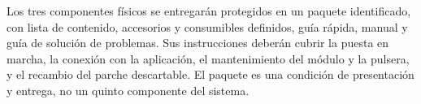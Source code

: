 Los tres componentes físicos se entregarán protegidos en un paquete identificado, con lista de contenido, accesorios y consumibles definidos, guía rápida, manual y guía de solución de problemas. Sus instrucciones deberán cubrir la puesta en marcha, la conexión con la aplicación, el mantenimiento del módulo y la pulsera, y el recambio del parche descartable. El paquete es una condición de presentación y entrega, no un quinto componente del sistema.


